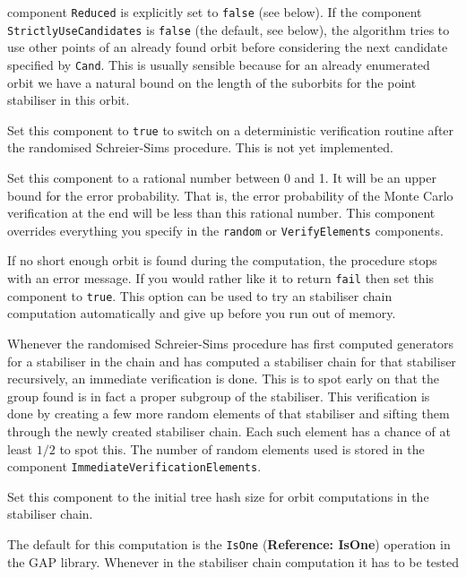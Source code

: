 \documentclass[a4paper,11pt]{report}
\begin{document}
{{\begin{description}
component \texttt{Reduced} is explicitly set to \texttt{false} (see below). If the component \texttt{StrictlyUseCandidates} is \texttt{false} (the default, see below), the algorithm tries to use other points of an
already found orbit before considering the next candidate specified by \texttt{Cand}. This is usually sensible because for an already enumerated orbit we have a
natural bound on the length of the suborbits for the point stabiliser in this
orbit. 
\item[{\texttt{DeterministicVerification}}]  Set this component to \texttt{true} to switch on a deterministic verification routine after the randomised
Schreier-Sims procedure. This is not yet implemented. 
\item[{\texttt{ErrorBound}}]  Set this component to a rational number between 0 and 1. It will be an upper
bound for the error probability. That is, the error probability of the Monte
Carlo verification at the end will be less than this rational number. This
component overrides everything you specify in the \texttt{random} or \texttt{VerifyElements} components. 
\item[{\texttt{FailInsteadOfError}}]  If no short enough orbit is found during the computation, the procedure stops
with an error message. If you would rather like it to return \texttt{fail} then set this component to \texttt{true}. This option can be used to try an stabiliser chain computation automatically
and give up before you run out of memory. 
\item[{\texttt{ImmediateVerificationElements}}] Whenever the randomised Schreier-Sims procedure has first computed generators
for a stabiliser in the chain and has computed a stabiliser chain for that
stabiliser recursively, an immediate verification is done. This is to spot
early on that the group found is in fact a proper subgroup of the stabiliser.
This verification is done by creating a few more random elements of that
stabiliser and sifting them through the newly created stabiliser chain. Each
such element has a chance of at least $1/2$ to spot this. The number of random elements used is stored in the component \texttt{ImmediateVerificationElements}. 
\item[{\texttt{InitialHashSize}}]  Set this component to the initial tree hash size for orbit computations in the
stabiliser chain. 
\item[{\texttt{IsOne}}]  The default for this computation is the \texttt{IsOne} (\textbf{Reference: IsOne}) operation in the \textsf{GAP} library. Whenever in the stabiliser chain computation it has to be tested

\end{description}}}
\end{document}
